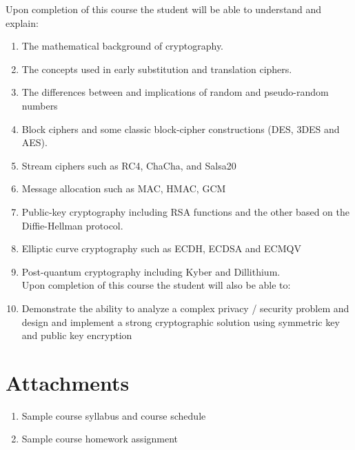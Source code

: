 \documentclass[10pt,a4paper]{article}
\begin{document}
Upon completion of this course the student will be able to understand and explain: 
\begin{enumerate}
\item The mathematical background of cryptography.
\item The concepts used in early substitution and translation ciphers.
\item The differences between and implications of random and pseudo-random numbers
\item Block ciphers and some classic block-cipher constructions (DES, 3DES and AES).
\item Stream ciphers such as RC4, ChaCha, and Salsa20
\item Message allocation such as MAC, HMAC, GCM
\item Public-key cryptography including RSA functions and the other based on the Diffie-Hellman protocol.
\item Elliptic curve cryptography such as ECDH, ECDSA and ECMQV
\item Post-quantum cryptography including Kyber and Dillithium.\\

\noindent Upon completion of this course the student will also be able to:\\
\item Demonstrate the ability to analyze a complex privacy / security problem and design and implement a strong cryptographic solution using symmetric key and public key encryption
\end{enumerate}

\section*{Attachments}
\begin{enumerate}
\item Sample course syllabus and course schedule
\item Sample course homework assignment
\end{enumerate}
\end{document}
